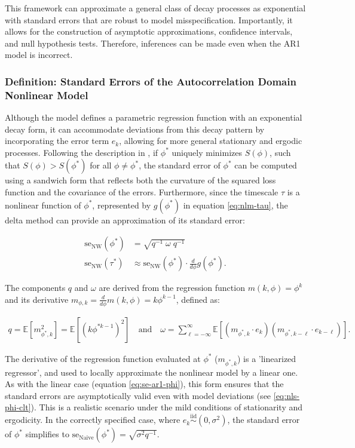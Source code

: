 \documentclass[main.tex]{subfiles}
\begin{document}
This framework can approximate a general class of decay processes as exponential with standard errors that are robust to model misspecification. Importantly, it allows for the construction of asymptotic approximations, confidence intervals, and null hypothesis tests. Therefore, inferences can be made even when the AR1 model is incorrect.

\subsubsection{Definition: Standard Errors of the Autocorrelation Domain Nonlinear Model}

Although the model defines a parametric regression function with an exponential decay form, it can accommodate deviations from this decay pattern by incorporating the error term $e_k$, allowing for more general stationary and ergodic processes. Following the description in \citet[chapter~22.8, chapter~23.5]{hansen_econometrics_2022}, if $\phi^*$ uniquely minimizes $S(\phi)$, such that $S(\phi) > S(\phi^*)$ for all $\phi \neq \phi^*$, the standard error of $\phi^*$ can be computed using a sandwich form that reflects both the curvature of the squared loss function and the covariance of the errors. Furthermore, since the timescale $\tau$ is a nonlinear function of $\phi^*$, represented by $g(\phi^*)$ in equation \eqref{eq:nlm-tau}, the delta method can provide an approximation of its standard error:

\begin{align}
    \text{se}_\text{NW}(\phi^*) &= \sqrt{q^{-1}\; \omega \;q^{-1}}\\
    \text{se}_\text{NW}(\tau^*) &\approx \text{se}_\text{NW}(\phi^*) \cdot \frac{d}{d\phi}g(\phi^*).
\end{align}

\noindent The components $q$ and $\omega$ are derived from the regression function $m(k, \phi) = \phi^k$ and its derivative $m_{\phi, k} = \frac{d}{d\phi} m(k, \phi) = k \phi^{k-1}$, defined as:

\begin{align*}
    q = \mathbb{E}[m_{\phi^*, k}^2] = \mathbb{E}[(k \phi^{*k-1})^2] \quad\text{and}\quad
    \omega = \sum_{\ell=-\infty}^{\infty} \mathbb{E}[(m_{\phi^*, k} \cdot e_{k})(m_{\phi^*, k-\ell} \cdot e_{k-\ell})].
\end{align*}

The derivative of the regression function evaluated at $\phi^*$ ($m_{\phi^*, k}$) is a 'linearized regressor', and used to locally approximate the nonlinear model by a linear one. As with the linear case (equation \eqref{eq:se-ar1-phi}), this form ensures that the standard errors are asymptotically valid even with model deviations (see \eqref{eq:nls-phi-clt}). This is a realistic scenario under the mild conditions of stationarity and ergodicity. In the correctly specified case, where $e_k \overset{\text{iid}}{\sim} (0, \sigma^2)$, the standard error of $\phi^*$ simplifies to $\text{se}_{\text{Naive}}(\phi^*) = \sqrt{\sigma^2 q^{-1}}$.\\
\end{document}
